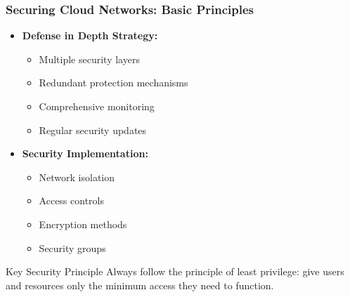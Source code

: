 \documentclass{beamer}
\begin{document}
\begin{frame}
    \frametitle{Securing Cloud Networks: Basic Principles}
    
    \begin{itemize}
        \item \textbf{Defense in Depth Strategy:}
        \begin{itemize}
            \item Multiple security layers
            \item Redundant protection mechanisms
            \item Comprehensive monitoring
            \item Regular security updates
        \end{itemize}
        
        \item \textbf{Security Implementation:}
        \begin{itemize}
            \item Network isolation
            \item Access controls
            \item Encryption methods
            \item Security groups
        \end{itemize}
    \end{itemize}
    
    \begin{alertblock}{Key Security Principle}
        Always follow the principle of least privilege: give users and resources only the minimum access they need to function.
    \end{alertblock}
\end{frame}
\end{document}
